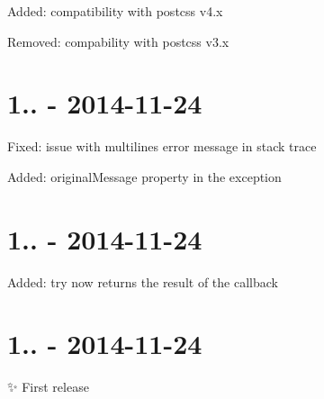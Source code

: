 
\begin{DoxyItemize}
\item Added\+: compatibility with postcss v4.\+x
\item Removed\+: compability with postcss v3.\+x
\end{DoxyItemize}

\section*{1.. -\/ 2014-\/11-\/24}


\begin{DoxyItemize}
\item Fixed\+: issue with multilines error message in stack trace
\item Added\+: {\ttfamily original\+Message} property in the exception
\end{DoxyItemize}

\section*{1.. -\/ 2014-\/11-\/24}


\begin{DoxyItemize}
\item Added\+: {\ttfamily try} now returns the result of the callback
\end{DoxyItemize}

\section*{1.. -\/ 2014-\/11-\/24}

✨ First release 